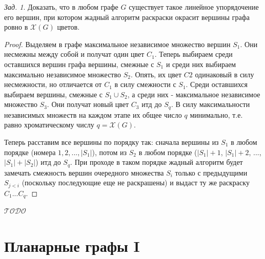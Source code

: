 \documentclass[a4paper,12pt]{article}
\theoremstyle{remark}
\newtheorem{problem}{Зад.}[section]
\def\iiChi{\mathcal{X}}
\def\iiTODO{\guillemotleft$\mathcal{TODO}$\guillemotright\textellipsis}
\begin{document}
\begin{problem}
	Доказать, что в любом графе $G$ существует такое линейное упорядочение его вершин, при котором жадный алгоритм раскраски окрасит вершины графа ровно в $\iiChi(G)$ цветов.
\end{problem}
\begin{proof}
	Выделяем в графе максимальное независимое множество вершин $S_1$. Они несмежны между собой и получат один цвет $C_1$. Теперь выбираем среди оставшихся вершин графа вершины, смежные с $S_1$ и среди них выбираем максимально независимое множество $S_2$. Опять, их цвет $C2$ одинаковый в силу несмежности, но отличается от $C_1$ в силу смежности с $S_1$. Среди оставшихся выбираем вершины, смежные с $S_1 \cup S_2$, а среди них - максимальное независимое множество $S_3$. Они получат новый цвет $C_3$ итд до $S_q$. В силу максимальности независимых множеств на каждом этапе их общее число $q$ минимально, т.е. равно хроматическому числу $q = \iiChi(G)$.
	
	Теперь расставим все вершины по порядку так: сначала вершины из $S_1$ в любом порядке (номера $1,2,...,|S_1|$), потом из $S_2$ в любом порядке ($|S_1|+1$, $|S_1|+2$, ..., $|S_1|+|S_2|$) итд до $S_q$. При проходе в таком порядке жадный алгоритм будет замечать смежность вершин очередного множества $S_i$ только с предыдущими $S_{j<i}$ (поскольку последующие еще не раскрашены) и выдаст ту же раскраску $C_1...C_q$.
\end{proof}


\iiTODO




\section{Планарные графы I}
\end{document}
